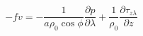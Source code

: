 \begin{equation}
    -fv=-\frac{1}{a\rho_0\cos\phi}\frac{\partial p}{\partial\lambda} + \frac{1}{\rho_0}\frac{\partial\tau_{z\lambda}}{\partial z}
\label{EQN:MomU}
\end{equation}
